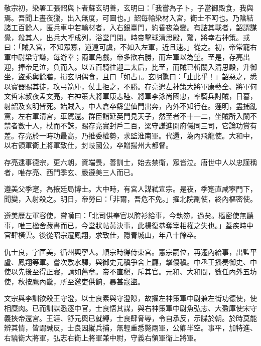 \begin{pinyinscope}
 敬宗初，染署工張韶與卜者蘇玄明善，玄明曰：「我嘗為子卜，子當御殿食，我與焉。吾聞上晝夜獵，出入無度，可圖也。」韶每輸染材入宮，衛士不呵也。乃陰結諸工百餘人，匿兵車中若輸材者，入右銀臺門，約昏夜為變。有詰其載者，韶謂謀覺，殺其人，出兵大呼成列，浴堂門閉。時帝擊球清思殿，驚，將幸右神策。或曰：「賊入宮，不知眾寡，道遠可虞，不如入左軍，近且速。」從之。初，帝常寵右軍中尉梁守謙，每游幸；兩軍角戲，帝多欲右勝，而左軍以為望。至是，存亮出迎，捧帝足泣，負而入。以五百騎往迎二太后，比至，而賊已斬關入清思殿，升御坐，盜乘輿餘膳，揖玄明偶食，且曰「如占」。玄明驚曰：「止此乎！」韶惡之，悉以寶器賜其徒，攻弓箭庫，仗士拒之，不勝。存亮遣左神策大將軍康藝全、將軍何文哲宋叔夜孟文亮，右神策大將軍康志睦、將軍李泳尚國忠，率騎兵討賊，日暮，射韶及玄明皆死。始賊入，中人倉卒繇望仙門出奔，內外不知行在。遲明，盡捕亂黨，左右軍清宮，車駕還。群臣詣延英門見天子，然至者不十一二，坐賊所入闌不禁者數十人，杖而不誅，賜存亮實封戶二百，梁守謙進開府儀同三司，它論功賞有差。存亮於一時功最高，乃推委權勢，求監淮南軍。代還，為內飛龍使。大和中，以右領軍衛上將軍致仕，封岐國公，卒贈揚州大都督。



 存亮逮事德宗，更六朝，資端畏，善訓士，始去禁衛，眾皆泣。唐世中人以忠謹稱者，唯存亮、西門季玄、嚴遵美三人而已。



 遵美父季寔，為掖廷局博士。大中時，有宮人謀弒宣宗。是夜，季寔直咸寧門下，聞變，入射殺之。明日，帝勞曰：「非爾，吾危不免。」擢北院副使，終內樞密使。



 遵美歷左軍容使，嘗嘆曰：「北司供奉官以胯衫給事，今執笏，過矣。樞密使無聽事，唯三楹舍藏書而已，今堂狀帖黃決事，此楊復恭奪宰相權之失也。」蓋疾時中官肆橫雲。後從昭宗遷鳳翔，求致仕，隱青城山，年八十餘卒。



 仇士良，字匡美，循州興寧人。順宗時得侍東宮。憲宗嗣位，再遷內給事，出監平盧、鳳翔等軍。嘗次敷水驛，與御史元稹爭舍上廳，擊傷稹。中丞王播奏御史、中使以先後至得正寢，請如舊章。帝不直稹，斥其官。元和、大和間，數任內外五坊使，秋按鷹內畿，所至邀吏供餉，暴甚寇盜。



 文宗與李訓欲殺王守澄，以士良素與守澄隙，故擢左神策軍中尉兼左街功德使，使相糜肉。已而訓謀悉逐中官，士良悟其謀，與右神策軍中尉魚弘志、大盈庫使宋守義挾帝還宮。王涯、舒元輿已就縛，士良肆脅辱，令自承反，示牒於朝。於時莫能辨其情，皆謂誠反，士良因縱兵捕，無輕重悉斃兩軍，公卿半空。事平，加特進、右驍衛大將軍，弘志右衛上將軍兼中尉，守義右領軍衛上將軍。




\end{pinyinscope}
